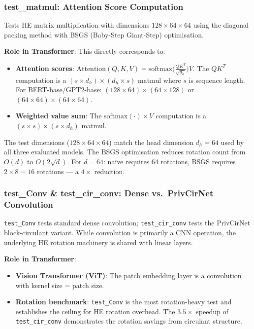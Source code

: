 \subsubsection{test\_matmul: Attention Score Computation}

Tests HE matrix multiplication with dimensions $128 \times 64 \times 64$ using the diagonal packing method with BSGS (Baby-Step Giant-Step) optimisation.

\textbf{Role in Transformer}: This directly corresponds to:
\begin{itemize}[nosep]
  \item \textbf{Attention scores}: $\text{Attention}(Q,K,V) = \text{softmax}\!\bigl(\frac{QK^T}{\sqrt{d_h}}\bigr)V$. The $QK^T$ computation is a $(s \times d_h) \times (d_h \times s)$ matmul where $s$ is sequence length.
        For BERT-base/GPT2-base: $(128 \times 64) \times (64 \times 128)$ or $(64 \times 64) \times (64 \times 64)$.
  \item \textbf{Weighted value sum}: The $\text{softmax}(\cdot) \times V$ computation is a $(s \times s) \times (s \times d_h)$ matmul.
\end{itemize}

The test dimensions ($128 \times 64 \times 64$) match the head dimension $d_h{=}64$ used by all three evaluated models.
The BSGS optimisation reduces rotation count from $O(d)$ to $O(2\sqrt{d})$.
For $d{=}64$: na\"ive requires 64 rotations, BSGS requires $2 \times 8 = 16$ rotations --- a $4\times$ reduction.

\subsubsection{test\_Conv \& test\_cir\_conv: Dense vs.\ PrivCirNet Convolution}

\texttt{test\_Conv} tests standard dense convolution; \texttt{test\_cir\_conv} tests the PrivCirNet block-circulant variant.
While convolution is primarily a CNN operation, the underlying HE rotation machinery is shared with linear layers.

\textbf{Role in Transformer}:
\begin{itemize}[nosep]
  \item \textbf{Vision Transformer (ViT)}: The patch embedding layer is a convolution with kernel size = patch size.
  \item \textbf{Rotation benchmark}: \texttt{test\_Conv} is the most rotation-heavy test and establishes the ceiling for HE rotation overhead. The $3.5\times$ speedup of \texttt{test\_cir\_conv} demonstrates the rotation savings from circulant structure.
\end{itemize}

